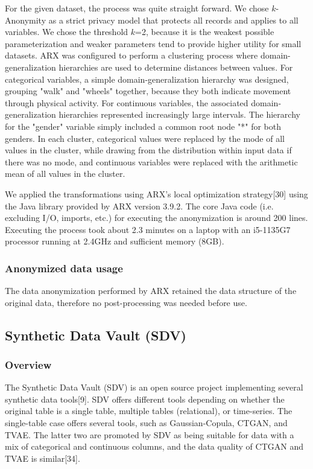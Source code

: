 \documentclass[10pt]{article}
\newcommand{\mycite}[1]{[#1]}
\begin{document}
For the given dataset, the process was quite straight forward. We chose $k$-Anonymity as a strict privacy model that protects all records and applies to all variables. We chose the threshold $k$=2, because it is the weakest possible parameterization and weaker parameters tend to provide higher utility for small datasets. ARX was configured to perform a clustering process where domain-generalization hierarchies are used to determine distances between values. For categorical variables, a simple domain-generalization hierarchy was designed, grouping "walk" and "wheels" together, because they both indicate movement through physical activity. For continuous variables, the associated domain-generalization hierarchies represented increasingly large intervals. The hierarchy for the "gender" variable simply included a common root node "*" for both genders. In each cluster, categorical values were replaced by the mode of all values in the cluster, while drawing from the distribution within input data if there was no mode, and continuous variables were replaced with the arithmetic mean of all values in the cluster.

We applied the transformations using ARX's local optimization strategy\mycite{30} using the Java library provided by ARX version 3.9.2. The core Java code (i.e. excluding I/O, imports, etc.) for executing the anonymization is around 200 lines. Executing the process took about 2.3 minutes on a laptop with an i5-1135G7 processor running at 2.4GHz and sufficient memory (8GB).

\subsubsection*{Anonymized data usage}

The data anonymization performed by ARX retained the data structure of the original data, therefore no post-processing was needed before use.

\subsection*{Synthetic Data Vault (SDV)}
\label{sec:method_sdv}

\subsubsection*{Overview}

The Synthetic Data Vault (SDV) is an open source project implementing several synthetic data tools\mycite{9}. SDV offers different tools depending on whether the original table is a single table, multiple tables (relational), or time-series. The single-table case offers several tools, such as Gaussian-Copula, CTGAN, and TVAE. The latter two are promoted by SDV as being suitable for data with a mix of categorical and continuous columns, and the data quality of CTGAN and TVAE is similar\mycite{34}. 
\end{document}
